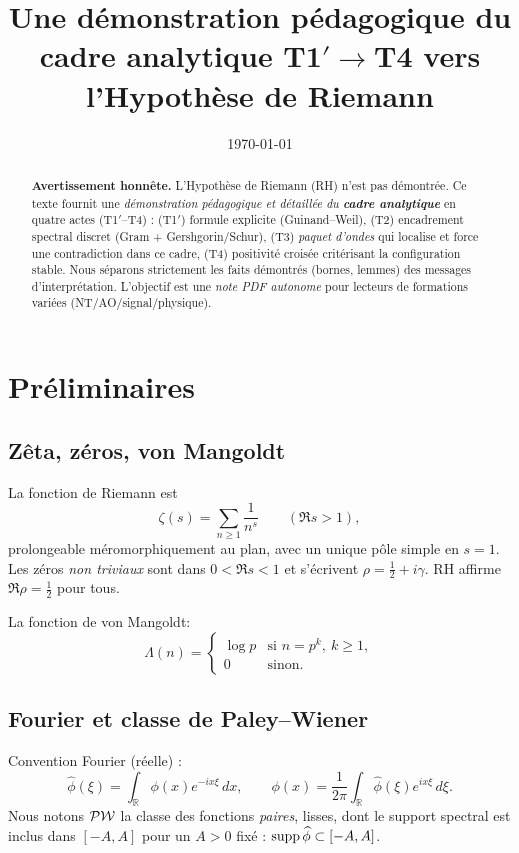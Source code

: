 \documentclass[11pt,a4paper]{proofarticle}
\title{Une démonstration pédagogique du cadre analytique T1$′$$\to$T4 vers l'Hypothèse de Riemann}
\author{\InterIAauthors}
\date{\today}
\begin{document}


\maketitle
\begin{abstract}
\textbf{Avertissement honnête.} L'Hypothèse de Riemann (RH) n'est pas démontrée.
Ce texte fournit une \emph{démonstration pédagogique et détaillée du \textbf{cadre analytique}} en quatre actes
(T1$′$--T4) : (T1$′$) formule explicite (Guinand--Weil), (T2) encadrement spectral discret (Gram + Gershgorin/Schur),
(T3) \emph{paquet d’ondes} qui localise et force une contradiction dans ce cadre, (T4) positivité croisée
critérisant la configuration stable. Nous séparons strictement les faits démontrés (bornes, lemmes) des messages
d'interprétation. L'objectif est une \emph{note PDF autonome} pour lecteurs de formations variées (NT/AO/signal/physique).
\end{abstract}
\tableofcontents
\section{Préliminaires}
\subsection{Zêta, zéros, von Mangoldt}
La fonction de Riemann est
\[
\zeta(s)=\sum_{n\ge 1} \frac{1}{n^s}\qquad (\Re s>1),
\]
prolongeable méromorphiquement au plan, avec un unique pôle simple en $s=1$.
Les zéros \emph{non triviaux} sont dans $0<\Re s<1$ et s'écrivent $\rho=\tfrac12+i\gamma$.
RH affirme $\Re \rho=\frac12$ pour tous.

La fonction de von Mangoldt:
\[
\Lambda(n)=
\begin{cases}
\log p &\text{si } n=p^k,\ k\ge 1,\\
0 &\text{sinon.}
\end{cases}
\]

\subsection{Fourier et classe de Paley--Wiener}
Convention Fourier (réelle) :
\[
\widehat\phi(\xi)=\int_{\mathbb R}\phi(x)e^{-ix\xi}\,dx,\qquad
\phi(x)=\frac{1}{2\pi}\int_{\mathbb R}\widehat\phi(\xi)e^{ix\xi}\,d\xi.
\]
Nous notons $\mathcal{PW}$ la classe des fonctions \emph{paires}, lisses, dont le support spectral est inclus dans $[-A,A]$
pour un $A>0$ fixé : $\operatorname{supp} \widehat\phi\subset[-A,A]$.
\end{document}
